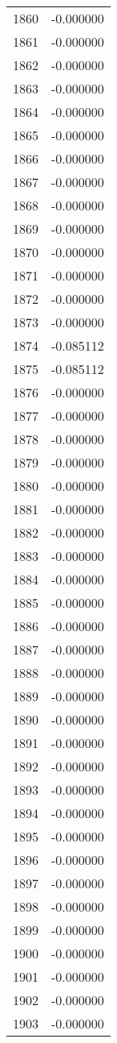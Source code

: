 \documentclass[12pt]{article}
\begin{document}
\begin{longtable}{@{}cc@{}}
1860 & -0.000000 \\
1861 & -0.000000 \\
1862 & -0.000000 \\
1863 & -0.000000 \\
1864 & -0.000000 \\
1865 & -0.000000 \\
1866 & -0.000000 \\
1867 & -0.000000 \\
1868 & -0.000000 \\
1869 & -0.000000 \\
1870 & -0.000000 \\
1871 & -0.000000 \\
1872 & -0.000000 \\
1873 & -0.000000 \\
1874 & -0.085112 \\
1875 & -0.085112 \\
1876 & -0.000000 \\
1877 & -0.000000 \\
1878 & -0.000000 \\
1879 & -0.000000 \\
1880 & -0.000000 \\
1881 & -0.000000 \\
1882 & -0.000000 \\
1883 & -0.000000 \\
1884 & -0.000000 \\
1885 & -0.000000 \\
1886 & -0.000000 \\
1887 & -0.000000 \\
1888 & -0.000000 \\
1889 & -0.000000 \\
1890 & -0.000000 \\
1891 & -0.000000 \\
1892 & -0.000000 \\
1893 & -0.000000 \\
1894 & -0.000000 \\
1895 & -0.000000 \\
1896 & -0.000000 \\
1897 & -0.000000 \\
1898 & -0.000000 \\
1899 & -0.000000 \\
1900 & -0.000000 \\
1901 & -0.000000 \\
1902 & -0.000000 \\
1903 & -0.000000 \\

\end{longtable}
\end{document}
